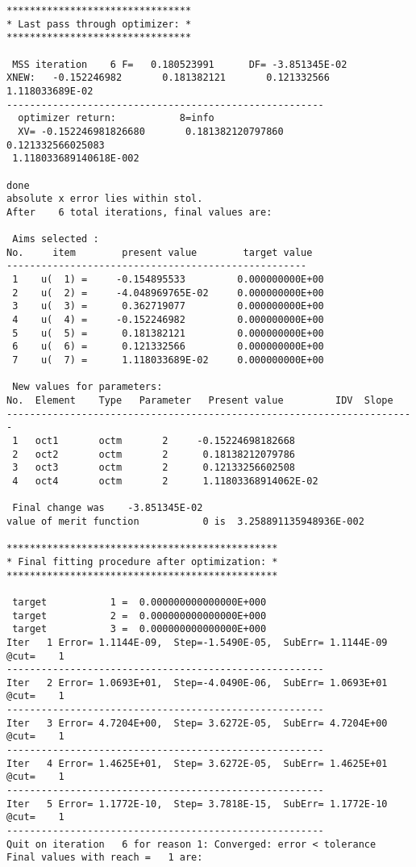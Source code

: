 \begin{footnotesize}
\begin{verbatim}
********************************
* Last pass through optimizer: *
********************************

 MSS iteration    6 F=   0.180523991      DF= -3.851345E-02
XNEW:   -0.152246982       0.181382121       0.121332566       1.118033689E-02
-------------------------------------------------------
  optimizer return:           8=info
  XV= -0.152246981826680       0.181382120797860       0.121332566025083
 1.118033689140618E-002

done
absolute x error lies within stol.
After    6 total iterations, final values are:

 Aims selected :
No.     item        present value        target value
----------------------------------------------------
 1    u(  1) =     -0.154895533         0.000000000E+00
 2    u(  2) =     -4.048969765E-02     0.000000000E+00
 3    u(  3) =      0.362719077         0.000000000E+00
 4    u(  4) =     -0.152246982         0.000000000E+00
 5    u(  5) =      0.181382121         0.000000000E+00
 6    u(  6) =      0.121332566         0.000000000E+00
 7    u(  7) =      1.118033689E-02     0.000000000E+00

 New values for parameters:
No.  Element    Type   Parameter   Present value         IDV  Slope
-----------------------------------------------------------------------
 1   oct1       octm       2     -0.15224698182668
 2   oct2       octm       2      0.18138212079786
 3   oct3       octm       2      0.12133256602508
 4   oct4       octm       2      1.11803368914062E-02

 Final change was    -3.851345E-02
value of merit function           0 is  3.258891135948936E-002

***********************************************
* Final fitting procedure after optimization: *
***********************************************

 target           1 =  0.000000000000000E+000
 target           2 =  0.000000000000000E+000
 target           3 =  0.000000000000000E+000
Iter   1 Error= 1.1144E-09,  Step=-1.5490E-05,  SubErr= 1.1144E-09 @cut=    1
-------------------------------------------------------
Iter   2 Error= 1.0693E+01,  Step=-4.0490E-06,  SubErr= 1.0693E+01 @cut=    1
-------------------------------------------------------
Iter   3 Error= 4.7204E+00,  Step= 3.6272E-05,  SubErr= 4.7204E+00 @cut=    1
-------------------------------------------------------
Iter   4 Error= 1.4625E+01,  Step= 3.6272E-05,  SubErr= 1.4625E+01 @cut=    1
-------------------------------------------------------
Iter   5 Error= 1.1772E-10,  Step= 3.7818E-15,  SubErr= 1.1772E-10 @cut=    1
-------------------------------------------------------
Quit on iteration   6 for reason 1: Converged: error < tolerance
Final values with reach =   1 are:


\end{verbatim}
\end{footnotesize}
